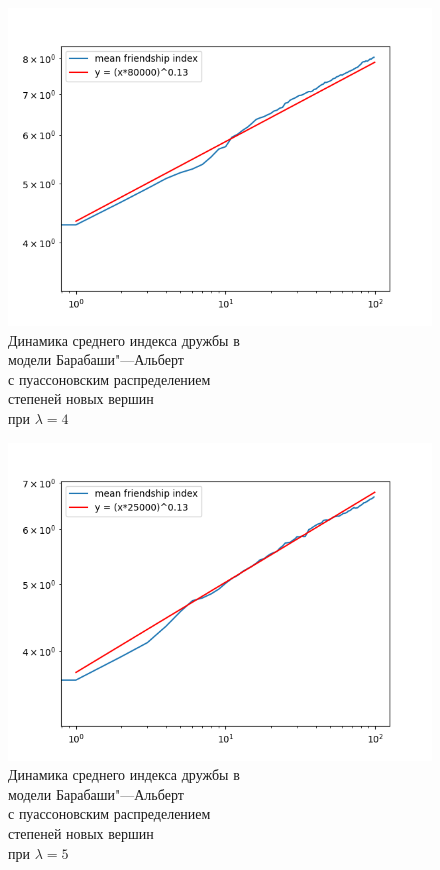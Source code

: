 \documentclass[bachelor, och, diploma]{SCWorks}
\begin{document}
\begin{figure}[!ht]
    \centering
    \includegraphics[scale=0.7]{diploma_results/dynamic_log/bap_mean_beta_4.png}
    \caption{Динамика среднего индекса дружбы  в\\ модели Барабаши"---Альберт\\ с пуассоновским распределением\\ степеней новых вершин \\ при $\lambda=4$}
\end{figure}
\begin{figure}[!ht]
    \centering
    \includegraphics[scale=0.7]{diploma_results/dynamic_log/bap_mean_beta_5.png}
    \caption{Динамика среднего индекса дружбы  в\\ модели Барабаши"---Альберт\\ с пуассоновским распределением\\ степеней новых вершин \\ при $\lambda=5$}
\end{figure}
\end{document}
